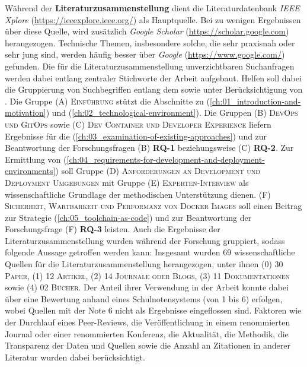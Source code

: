 Während der \textbf{Literaturzusammenstellung} dient die Literaturdatenbank \textit{IEEE Xplore} (\url{https://ieeexplore.ieee.org/}) als Hauptquelle. Bei zu wenigen Ergebnissen über diese Quelle, wird zusätzlich \textit{Google Scholar} (\url{https://scholar.google.com}) herangezogen. Technische Themen, insbesondere solche, die sehr praxisnah oder sehr jung sind, werden häufig besser über \textit{Google} (\url{https://www.google.com/}) gefunden. Die für die Literaturzusammenstellung unverzichtbaren Suchanfragen werden dabei entlang zentraler Stichworte der Arbeit aufgebaut. Helfen soll dabei die Gruppierung von Suchbegriffen entlang dem  sowie unter Berücksichtigung von . Die Gruppe \textsc{(A) Einführung} stützt die Abschnitte zu  (\autoref{ch:01_introduction-and-motivation}) und  (\autoref{ch:02_technological-environment}). Die Gruppen \textsc{(B) DevOps und GitOps} sowie \textsc{(C) Dev Container und Developer Experience} liefern Ergebnisse für die  (\autoref{ch:03_examination-of-existing-approaches}) und zur Beantwortung der Forschungsfragen \textsc{(B)} \textbf{RQ-1} beziehungsweise \textsc{(C)} \textbf{RQ-2}. Zur Ermittlung von  (\autoref{ch:04_requirements-for-development-and-deployment-environments}) soll Gruppe \textsc{(D) Anforderungen an Development und Deployment Umgebungen} mit Gruppe \textsc{(E) Experten-Interview} als wissenschaftliche Grundlage der methodischen Unterstützung dienen. \textsc{(F) Sicherheit, Wartbarkeit und Performanz von Docker Images} soll einen Beitrag zur  Strategie (\autoref{ch:05_toolchain-as-code}) und zur Beantwortung der Forschungsfrage \textsc{(F)} \textbf{RQ-3} leisten. Auch die Ergebnisse der Literaturzusammenstellung wurden während der Forschung gruppiert, sodass folgende Aussage getroffen werden kann: Insgesamt wurden 69 wissenschaftliche Quellen für die Literaturzusammenstellung herangezogen, unter ihnen \textsc{(0)} 30 \textsc{Paper}, \textsc{(1)} 12 \textsc{Artikel}, \textsc{(2)} 14 \textsc{Journale oder Blogs}, \textsc{(3)} 11 \textsc{Dokumentationen} sowie \textsc{(4)} 02 \textsc{Bücher}. Der Anteil ihrer Verwendung in der Arbeit konnte dabei über eine Bewertung anhand eines Schulnotensystems (von 1 bis 6) erfolgen, wobei Quellen mit der Note 6 nicht als Ergebnisse eingeflossen sind. Faktoren wie der Durchlauf eines Peer-Reviews, die Veröffentlichung in einem renommierten Journal oder einer renommierten Konferenz, die Aktualität, die Methodik, die Transparenz der Daten und Quellen sowie die Anzahl an Zitationen in anderer Literatur wurden dabei berücksichtigt.

